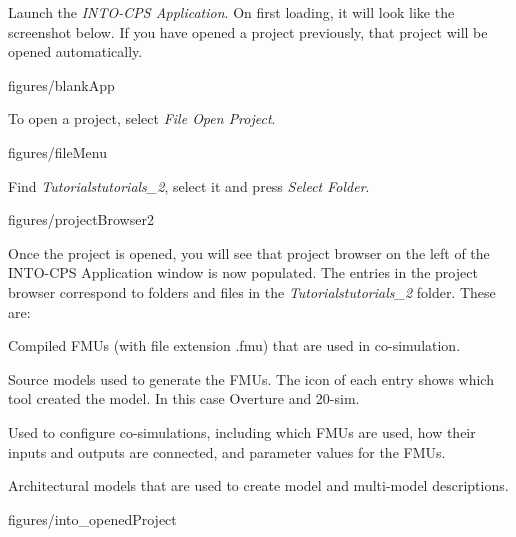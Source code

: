 \documentclass[11pt,a4paper]{../tutorial}
\begin{document}
\begin{instructions}
\item Launch the \emph{INTO-CPS Application}. On first loading, it will look like the screenshot below. If you have opened a project previously, that project will be opened automatically.

\begin{annotation}[width=0.85\linewidth]{figures/blankApp}
\end{annotation}

\item To open a project, select \emph{File \menusep Open Project}.

\begin{annotation}[width=0.85\linewidth,trim=0 260 0 0,clip]{figures/fileMenu}
\end{annotation}

\item Find \emph{Tutorials\pathsep{}tutorials\_2}, select it and press \emph{Select Folder}.

\begin{annotation}[width=0.85\linewidth]{figures/projectBrowser2}
\end{annotation}

\item Once the project is opened, you will see that project browser on the left of the INTO-CPS Application window is now populated. The entries in the project browser correspond to folders and files in the \emph{Tutorials\pathsep{}tutorials\_2} folder. These are:

    \begin{description}[noitemsep]
        \item[FMUs] Compiled FMUs (with file extension .fmu) that are used in co-simulation.
        \item[Models] Source models used to generate the FMUs. The icon of each entry shows which tool created the model. In this case Overture and 20-sim.
        \item[Multi-models] Used to configure co-simulations, including which FMUs are used, how their inputs and outputs are connected, and parameter values for the FMUs.
        \item[SysML] Architectural models that are used to create model and multi-model descriptions.
    \end{description}

    \begin{annotation}[height=0.64\linewidth,trim=0 0 250 0,clip]{figures/into_openedProject}
    \end{annotation}

\end{instructions}
\end{document}
